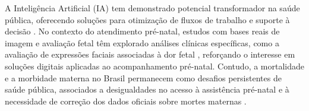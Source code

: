 \documentclass[12pt]{article}
\begin{document}




A Inteligência Artificial (IA) tem demonstrado potencial transformador na saúde pública, oferecendo soluções para otimização de fluxos de trabalho e suporte à decisão \cite{Rajpurkar2022, Cabitza2022}.
No contexto do atendimento pré-natal, estudos com bases reais de imagem e avaliação fetal têm explorado análises clínicas específicas, como a avaliação de expressões faciais associadas à dor fetal \cite{Bernardes2022FetalPain}, reforçando o interesse em soluções digitais aplicadas ao acompanhamento pré-natal.
Contudo, a mortalidade e a morbidade materna no Brasil permanecem como desafios persistentes de saúde pública, associados a desigualdades no acesso à assistência pré-natal e à necessidade de correção dos dados oficiais sobre mortes maternas \cite{AcessoPreNatal2018, Laurenti2010}.
\end{document}
